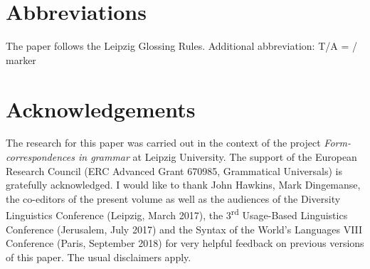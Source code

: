 \documentclass[output=paper]{langsci/langscibook}
\begin{document}
\section*{Abbreviations}

The paper follows the Leipzig Glossing Rules. Additional abbreviation: T/A = / marker

\section*{Acknowledgements}

The research for this paper was carried out in the context of the project \textit{Form- correspondences in grammar} at Leipzig University. The support of the European Research Council (ERC Advanced Grant 670985, Grammatical Universals) is gratefully acknowledged. I would like to thank John Hawkins, Mark Dingemanse, the co-editors of the present volume as well as the audiences of the Diversity Linguistics Conference (Leipzig,  {March 2017}), the 3\textsuperscript{rd} Usage-Based Linguistics Conference (Jerusalem,  {July 2017}) and the Syntax of the World’s Languages VIII Conference (Paris,  {September 2018}) for very helpful feedback on previous versions of this paper. The usual disclaimers apply.

\sloppy
\printbibliography[heading=subbibliography,notkeyword=this] 
\end{document}
